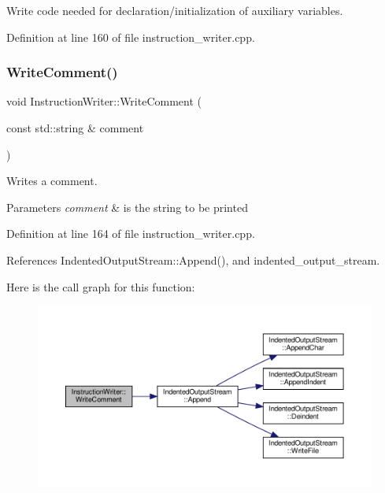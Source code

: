 Write code needed for declaration/initialization of auxiliary variables. 



Definition at line 160 of file instruction\+\_\+writer.\+cpp.

\mbox{\label{classInstructionWriter_a4e01f8751745f83b25d91064377ad46b}} 
\subsubsection{\texorpdfstring{Write\+Comment()}{WriteComment()}}
{\footnotesize\ttfamily void Instruction\+Writer\+::\+Write\+Comment (\begin{DoxyParamCaption}\item[{const std\+::string \&}]{comment }\end{DoxyParamCaption})}



Writes a comment. 


\begin{DoxyParams}{Parameters}
{\em comment} & is the string to be printed \\
\hline
\end{DoxyParams}


Definition at line 164 of file instruction\+\_\+writer.\+cpp.



References Indented\+Output\+Stream\+::\+Append(), and indented\+\_\+output\+\_\+stream.

Here is the call graph for this function\+:
\nopagebreak
\begin{figure}[H]
\begin{center}
\leavevmode
\includegraphics[width=350pt]{d3/d00/classInstructionWriter_a4e01f8751745f83b25d91064377ad46b_cgraph}
\end{center}
\end{figure}


